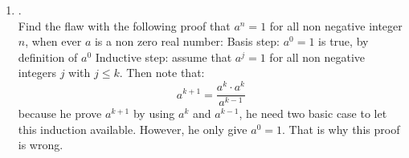 \documentclass{article}
\theoremstyle{definition}
\theoremstyle{plain}
\begin{document}
\begin {enumerate}[itemindent=30pt,label=\bf Exercise {\arabic*}:]
Use mathematical induction to prove that a set with $n$ elements has $n(n-1)/2$ sub sets containing exactly two elements whenever $n$ is an integer greater than or equal to 2.
\subitem for $n = 2$, it only has one subset. And $2(2-1)/2 = 1$. So this statement holds when $n = 2$
\subitem for $n > 2$, if we add one more element, the new element can form a set with all of the element in the old set. So the total number of sub set will increase k.
$$ \dfrac{k(k-1)}{2} + k = \dfrac{k(k+1)}{2}$$
\subitem Therefore inequality holds when $n=(k + 1)$.
\subitem Since both the basis and the inductive step have been performed, by mathematical induction, the statement holds for all $n \geq 2$, $n \in \mathbb{N}$ 
\item .\\
Find the flaw with the following proof that $a^n=1$ for all non negative integer $n$, when ever $a$ is a non zero real number: Basis step: $a^0=1$ is true, by definition of $a^0$ Inductive step: assume that $a^j=1$ for all non negative integers $j$ with $j \leq k$. Then note that:$$a^{k+1} = \dfrac{a^k \cdot a^k}{a^{k-1}}$$
\subitem because he prove $a^{k+1}$ by using $a^k$ and $a^{k-1}$, he need two basic case to let this induction available. However, he only give $a^0 = 1$. That is why this proof is wrong.


\end{enumerate}
\end{document}
